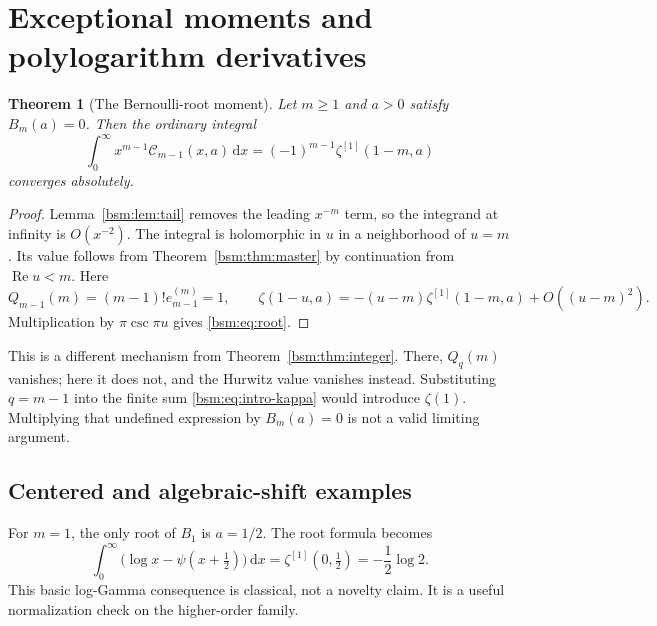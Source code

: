 \documentclass[11pt,letterpaper]{article}
\numberwithin{equation}{section}
\newtheorem{theorem}{Theorem}[section]
\theoremstyle{definition}\newtheorem{definition}[theorem]{Definition}
\theoremstyle{remark}\newtheorem{remark}[theorem]{Remark}
\DeclareMathOperator{\Ree}{Re}
\newcommand{\dd}{\,\mathrm{d}}
\newcommand{\Ccal}{\mathcal C}
\newcommand{\Qcal}{Q}
\begin{document}
\section{Exceptional moments and polylogarithm derivatives}\label{bsm:sec:exceptional}

\begin{theorem}[The Bernoulli-root moment]\label{bsm:thm:root}
Let $m\ge1$ and $a>0$ satisfy $B_m(a)=0$. Then the ordinary integral
\begin{equation}\label{bsm:eq:root}
 \boxed{\displaystyle
 \int_0^\infty x^{m-1}\Ccal_{m-1}(x,a)\dd x
          =(-1)^{m-1}\zeta^{[1]}(1-m,a)}
\end{equation}
converges absolutely.
\end{theorem}
\begin{proof}
Lemma~\ref{bsm:lem:tail} removes the leading $x^{-m}$ term, so the
integrand at infinity is $O(x^{-2})$. The integral is holomorphic
in $u$ in a neighborhood of $u=m$. Its value follows from
Theorem~\ref{bsm:thm:master} by continuation from $\Ree u<m$.
Here
\[
 \Qcal_{m-1}(m)=(m-1)!e_{m-1}^{(m)}=1,
 \qquad
 \zeta(1-u,a)=-(u-m)\zeta^{[1]}(1-m,a)+O((u-m)^2).
\]
Multiplication by $\pi\csc\pi u$ gives \eqref{bsm:eq:root}.
\end{proof}

This is a different mechanism from Theorem~\ref{bsm:thm:integer}. There,
$\Qcal_q(m)$ vanishes; here it does not, and the Hurwitz value vanishes
instead. Substituting $q=m-1$ into the finite sum
\eqref{bsm:eq:intro-kappa} would introduce $\zeta(1)$. Multiplying that
undefined expression by $B_m(a)=0$ is not a valid limiting argument.

\subsection{Centered and algebraic-shift examples}
For $m=1$, the only root of $B_1$ is $a=1/2$. The root formula becomes
\begin{equation}\label{bsm:eq:digamma-classical}
 \int_0^\infty\bigl(\log x-\psi(x+\tfrac12)\bigr)\dd x
               =\zeta^{[1]}(0,\tfrac12)=-\frac12\log2.
\end{equation}
This basic log-Gamma consequence is classical, not a novelty claim.
It is a useful normalization check on the higher-order family.
\end{document}
